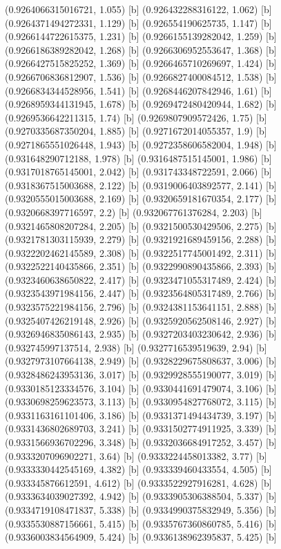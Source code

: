 {{{(0.9264066315016721, 1.055) [b] 
(0.926432288316122, 1.062) [b] 
(0.9264371494272331, 1.129) [b] 
(0.926554190625735, 1.147) [b] 
(0.9266144722615375, 1.231) [b] 
(0.9266155139282042, 1.259) [b] 
(0.9266186389282042, 1.268) [b] 
(0.9266306952553647, 1.368) [b] 
(0.9266427515825252, 1.369) [b] 
(0.9266465710269697, 1.424) [b] 
(0.9266706836812907, 1.536) [b] 
(0.9266827400084512, 1.538) [b] 
(0.9266834344528956, 1.541) [b] 
(0.9268446207842946, 1.61) [b] 
(0.9268959344131945, 1.678) [b] 
(0.9269472480420944, 1.682) [b] 
(0.9269536642211315, 1.74) [b] 
(0.9269807909572426, 1.75) [b] 
(0.9270335687350204, 1.885) [b] 
(0.9271672014055357, 1.9) [b] 
(0.9271865551026448, 1.943) [b] 
(0.9272358606582004, 1.948) [b] 
(0.931648290712188, 1.978) [b] 
(0.9316487515145001, 1.986) [b] 
(0.9317018765145001, 2.042) [b] 
(0.931743348722591, 2.066) [b] 
(0.9318367515003688, 2.122) [b] 
(0.9319006403892577, 2.141) [b] 
(0.9320555015003688, 2.169) [b] 
(0.9320659181670354, 2.177) [b] 
(0.9320668397716597, 2.2) [b] 
(0.932067761376284, 2.203) [b] 
(0.9321465808207284, 2.205) [b] 
(0.9321500530429506, 2.275) [b] 
(0.9321781303115939, 2.279) [b] 
(0.9321921689459156, 2.288) [b] 
(0.9322202462145589, 2.308) [b] 
(0.9322517745001492, 2.311) [b] 
(0.9322522140435866, 2.351) [b] 
(0.9322990890435866, 2.393) [b] 
(0.9323460638650822, 2.417) [b] 
(0.9323471055317489, 2.424) [b] 
(0.9323543971984156, 2.447) [b] 
(0.9323564805317489, 2.766) [b] 
(0.9323575221984156, 2.796) [b] 
(0.9324381153641151, 2.888) [b] 
(0.9325407426219148, 2.926) [b] 
(0.9325920562508146, 2.927) [b] 
(0.9326946835086143, 2.935) [b] 
(0.9327203403230642, 2.936) [b] 
(0.932745997137514, 2.938) [b] 
(0.9327716539519639, 2.94) [b] 
(0.9327973107664138, 2.949) [b] 
(0.9328229675808637, 3.006) [b] 
(0.9328486243953136, 3.017) [b] 
(0.9329928555190077, 3.019) [b] 
(0.9330185123334576, 3.104) [b] 
(0.9330441691479074, 3.106) [b] 
(0.9330698259623573, 3.113) [b] 
(0.9330954827768072, 3.115) [b] 
(0.9331163161101406, 3.186) [b] 
(0.9331371494434739, 3.197) [b] 
(0.9331436802689703, 3.241) [b] 
(0.9331502774911925, 3.339) [b] 
(0.9331566936702296, 3.348) [b] 
(0.9332036684917252, 3.457) [b] 
(0.9333207096902271, 3.64) [b] 
(0.9333224458013382, 3.77) [b] 
(0.9333330442545169, 4.382) [b] 
(0.933339460433554, 4.505) [b] 
(0.933345876612591, 4.612) [b] 
(0.9333522927916281, 4.628) [b] 
(0.9333634039027392, 4.942) [b] 
(0.9333905306388504, 5.337) [b] 
(0.9334719108471837, 5.338) [b] 
(0.9334990375832949, 5.356) [b] 
(0.9335530887156661, 5.415) [b] 
(0.9335767360860785, 5.416) [b] 
(0.9336003834564909, 5.424) [b] 
(0.9336138962395837, 5.425) [b] 
}}}
